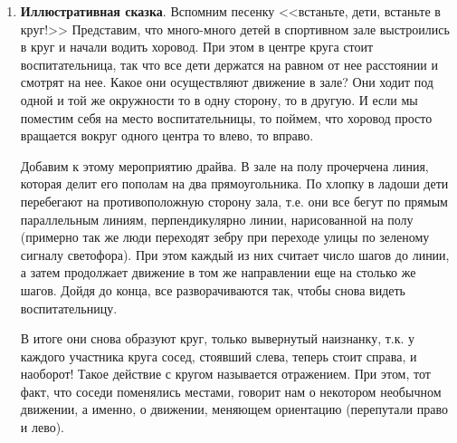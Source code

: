 \begin{enumerate}
\item \textbf{Иллюстративная сказка}. Вспомним песенку <<встаньте, дети, встаньте в круг!>> Представим, что много-много детей в спортивном зале выстроились в круг и начали водить хоровод. При этом в центре круга стоит воспитательница, так что все дети держатся на равном от нее расстоянии и смотрят на нее. Какое они осуществляют движение в зале? Они ходит под одной и той же окружности то в одну сторону, то в другую. И если мы поместим себя на место воспитательницы, то поймем, что хоровод просто вращается вокруг одного центра то влево, то вправо.

Добавим к этому мероприятию драйва. В зале на полу прочерчена линия, которая делит его пополам на два прямоугольника. По хлопку в ладоши дети перебегают на противоположную сторону зала, т.е. они все бегут по прямым параллельным линиям, перпендикулярно линии, нарисованной на полу (примерно так же люди переходят зебру при переходе улицы по зеленому сигналу светофора). При этом каждый из них считает число шагов до линии, а затем продолжает движение в том же направлении еще на столько же шагов. Дойдя до конца, все разворачиваются так, чтобы снова видеть воспитательницу.

В итоге они снова образуют круг, только вывернутый наизнанку, т.к. у каждого участника круга сосед, стоявший слева, теперь стоит справа, и наоборот! Такое действие с кругом называется отражением. При этом, тот факт, что соседи поменялись местами, говорит нам о некотором необычном движении, а именно, о движении, меняющем ориентацию (перепутали право и лево).


\end{enumerate}
